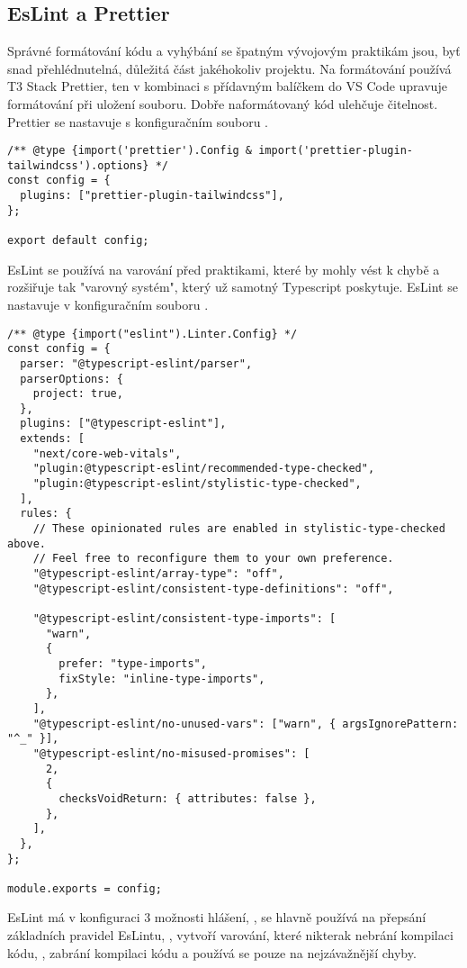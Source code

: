 \subsection{EsLint a Prettier}
Správné formátování kódu a vyhýbání se špatným vývojovým praktikám jsou, byť snad přehlédnutelná, důležitá část jakéhokoliv projektu. Na formátování používá T3 Stack Prettier, ten v kombinaci s přídavným balíčkem do VS Code upravuje formátování při uložení souboru. Dobře naformátovaný kód ulehčuje čitelnost. Prettier se nastavuje s konfiguračním souboru .
\begin{lstlisting}[caption=Konfigurační soubor Prettier]
/** @type {import('prettier').Config & import('prettier-plugin-tailwindcss').options} */
const config = {
  plugins: ["prettier-plugin-tailwindcss"],
};

export default config;
\end{lstlisting}
EsLint se používá na varování před praktikami, které by mohly vést k chybě a rozšiřuje tak "varovný systém", který už samotný Typescript poskytuje.
EsLint se nastavuje v konfiguračním souboru .


\begin{lstlisting}[caption=Konfigurační soubor EsLint]
    /** @type {import("eslint").Linter.Config} */
const config = {
  parser: "@typescript-eslint/parser",
  parserOptions: {
    project: true,
  },
  plugins: ["@typescript-eslint"],
  extends: [
    "next/core-web-vitals",
    "plugin:@typescript-eslint/recommended-type-checked",
    "plugin:@typescript-eslint/stylistic-type-checked",
  ],
  rules: {
    // These opinionated rules are enabled in stylistic-type-checked above.
    // Feel free to reconfigure them to your own preference.
    "@typescript-eslint/array-type": "off",
    "@typescript-eslint/consistent-type-definitions": "off",

    "@typescript-eslint/consistent-type-imports": [
      "warn",
      {
        prefer: "type-imports",
        fixStyle: "inline-type-imports",
      },
    ],
    "@typescript-eslint/no-unused-vars": ["warn", { argsIgnorePattern: "^_" }],
    "@typescript-eslint/no-misused-promises": [
      2,
      {
        checksVoidReturn: { attributes: false },
      },
    ],
  },
};

module.exports = config;
\end{lstlisting}
EsLint má v konfiguraci 3 možnosti hlášení, , se hlavně používá na přepsání základních pravidel EsLintu, , vytvoří varování, které nikterak nebrání kompilaci kódu, , zabrání kompilaci kódu a používá se pouze na nejzávažnější chyby\cite{eslint}.

